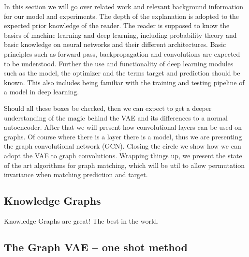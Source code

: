 In this section we will go over related work and relevant background information for our model and experiments. The depth of the explanation is adopted to the expected prior knowledge of the reader. The reader is supposed to know the basics of machine learning and deep learning, including probability theory and basic knowledge on neural networks and their different architectures. Basic principles such as forward pass, backpropagation and convolutions are expected to be understood. Further the use and functionality of deep learning modules such as the model, the optimizer and the terms target and prediction should be known. This also includes being familiar with the training and testing pipeline of a model in deep learning.

Should all these boxes be checked, then we can expect to get a deeper understanding of the magic behind the VAE and its differences to a normal autoencoder. After that we will present how convolutional layers can be used on graphs. Of course where there is a layer there is a model, thus we are presenting the graph convolutional network (GCN). Closing the circle we show how we can adopt the VAE to graph convolutions. Wrapping things up, we present the state of the art algorithms for graph matching, which will be util to allow permutation invariance when matching prediction and target.  


\subsection{Knowledge Graphs}

Knowledge Graphs are great! The best in the world.












\subsection{The Graph VAE – one shot method}

